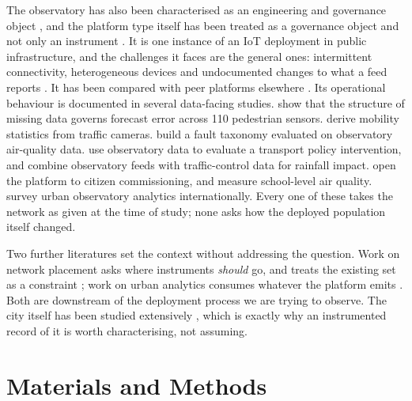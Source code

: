 \documentclass[fleqn,10pt,lineno]{wlpeerj}
\begin{document}
The observatory has also been characterised as an engineering and governance object
\citep{james2022realizing,wolf2025enduring}, and the platform type
itself has been treated as a governance object and not only an instrument
\citep{barns2018cities,cape1971overview}. It is one instance of an IoT deployment in
public infrastructure, and the challenges it faces are the general ones: intermittent
connectivity, heterogeneous devices and undocumented changes to what a feed
reports \citep{jamshed2022challenges,zeng2024sensors}. It has been compared with peer
platforms elsewhere \citep{derbali2025review,fernandesbarata2025learning,li2025space,longley2024infrastructure}.
Its operational
behaviour is documented in several data-facing studies. \citet{morriswiltshire2026} show that the structure of missing data governs forecast
error across \num{110} pedestrian sensors. \citet{chen2021cameras} derive
mobility statistics from traffic cameras. \citet{altarrazi2025dqd}
build a fault taxonomy evaluated on observatory air-quality data. \citet{farhadi2023ml} use observatory data to evaluate a transport policy
intervention, and \citet{wolf2023rainfall} combine observatory feeds with
traffic-control data for rainfall impact. \citet{puussaar2022sensemystreet}
open the platform to citizen commissioning, and \citet{keast2022} measure
school-level air quality. \citet{rusli2023review} survey urban observatory
analytics internationally. Every one of these takes the network as given at the time of
study; none asks how the deployed population itself changed.

Two further literatures set the context without addressing the question. Work on
network placement asks where instruments \emph{should} go, and treats the existing set
as a constraint
\citep{ayati2025optimizing,s2025wireless,nazeeyaanjum2025sensors,xu2024getting,malaker2024disparity};
work on urban analytics consumes whatever the platform emits
\citep{theodorakopoulos2026analytics,avram2026advancing,yu2023remote,huang2024crowdsourcing,enlund2022role}.
Both are downstream of the deployment process we are trying to observe. The city itself
has been studied extensively \citep{barke2025morphogenesis,wood2025myth}, which is
exactly why an instrumented record of it is worth characterising, not assuming.

\section*{Materials and Methods}
\label{sec:methods}
\end{document}
